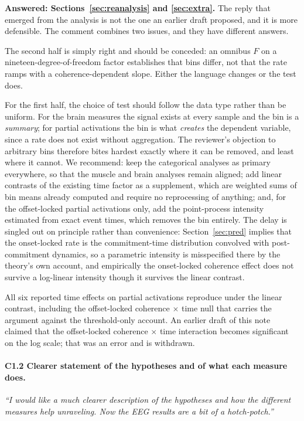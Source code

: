 \documentclass[a4paper,11pt]{article}
\newcommand{\NN}[1]{\textcolor{newcol}{#1}}
\newcommand{\1}{\mathbbm{1}}
\begin{document}
\textbf{Answered: Sections~\ref{sec:reanalysis} and \ref{sec:extra}.} \NN{The reply that emerged from the analysis
is not the one an earlier draft proposed, and it is more defensible.} The comment
combines two issues, and they have different answers.

The second half is simply right and should be conceded: an omnibus $F$ on a
nineteen-degree-of-freedom factor establishes that bins differ, not that the rate ramps
with a coherence-dependent slope. Either the language changes or the test does.

For the first half, the choice of test should follow the data type rather than be
uniform. For the brain measures the signal exists at every sample and the bin is a
\emph{summary}; for partial activations the bin is what \emph{creates} the dependent
variable, since a rate does not exist without aggregation. The reviewer's objection to
arbitrary bins therefore bites hardest exactly where it can be removed, and least where
it cannot. We recommend: keep the categorical analyses as primary everywhere, so that
the muscle and brain analyses remain aligned; add linear contrasts of the existing time
factor as a supplement, which are weighted sums of bin means already computed and
require no reprocessing of anything; and, for the offset-locked partial activations only,
add the point-process intensity estimated from exact event times, which removes the bin
entirely. The delay is singled out on principle rather than convenience:
Section~\ref{sec:pred} implies that the onset-locked rate is the
commitment-time distribution convolved with post-commitment dynamics, so a parametric
intensity is misspecified there by the theory's own account, and empirically the
onset-locked coherence effect does not survive a log-linear intensity though it
survives the linear contrast.

All six reported time effects on partial activations reproduce under the linear
contrast, including the offset-locked coherence $\times$ time null that carries the
argument against the threshold-only account. \NN{An earlier draft of this note claimed
that the offset-locked coherence $\times$ time interaction becomes significant on the log
scale; that was an error and is withdrawn.}

\paragraph{C1.2 Clearer statement of the hypotheses and of what each measure does.}
\emph{``I would like a much clearer description of the hypotheses and how the different
measures help unraveling. Now the EEG results are a bit of a hotch-potch.''}
\end{document}
